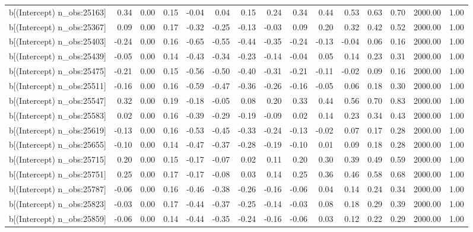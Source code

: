 \begin{table}[ht]
\begin{tabular}{rrrrrrrrrrrrrrr}
  b[(Intercept) n\_obs:25163] & 0.34 & 0.00 & 0.15 & -0.04 & 0.04 & 0.15 & 0.24 & 0.34 & 0.44 & 0.53 & 0.63 & 0.70 & 2000.00 & 1.00 \\ 
  b[(Intercept) n\_obs:25367] & 0.09 & 0.00 & 0.17 & -0.32 & -0.25 & -0.13 & -0.03 & 0.09 & 0.20 & 0.32 & 0.42 & 0.52 & 2000.00 & 1.00 \\ 
  b[(Intercept) n\_obs:25403] & -0.24 & 0.00 & 0.16 & -0.65 & -0.55 & -0.44 & -0.35 & -0.24 & -0.13 & -0.04 & 0.06 & 0.16 & 2000.00 & 1.00 \\ 
  b[(Intercept) n\_obs:25439] & -0.05 & 0.00 & 0.14 & -0.43 & -0.34 & -0.23 & -0.14 & -0.04 & 0.05 & 0.14 & 0.23 & 0.31 & 2000.00 & 1.00 \\ 
  b[(Intercept) n\_obs:25475] & -0.21 & 0.00 & 0.15 & -0.56 & -0.50 & -0.40 & -0.31 & -0.21 & -0.11 & -0.02 & 0.09 & 0.16 & 2000.00 & 1.00 \\ 
  b[(Intercept) n\_obs:25511] & -0.16 & 0.00 & 0.16 & -0.59 & -0.47 & -0.36 & -0.26 & -0.16 & -0.05 & 0.06 & 0.18 & 0.30 & 2000.00 & 1.00 \\ 
  b[(Intercept) n\_obs:25547] & 0.32 & 0.00 & 0.19 & -0.18 & -0.05 & 0.08 & 0.20 & 0.33 & 0.44 & 0.56 & 0.70 & 0.83 & 2000.00 & 1.00 \\ 
  b[(Intercept) n\_obs:25583] & 0.02 & 0.00 & 0.16 & -0.39 & -0.29 & -0.19 & -0.09 & 0.02 & 0.14 & 0.23 & 0.34 & 0.43 & 2000.00 & 1.00 \\ 
  b[(Intercept) n\_obs:25619] & -0.13 & 0.00 & 0.16 & -0.53 & -0.45 & -0.33 & -0.24 & -0.13 & -0.02 & 0.07 & 0.17 & 0.28 & 2000.00 & 1.00 \\ 
  b[(Intercept) n\_obs:25655] & -0.10 & 0.00 & 0.14 & -0.47 & -0.37 & -0.28 & -0.19 & -0.10 & 0.01 & 0.09 & 0.18 & 0.28 & 2000.00 & 1.00 \\ 
  b[(Intercept) n\_obs:25715] & 0.20 & 0.00 & 0.15 & -0.17 & -0.07 & 0.02 & 0.11 & 0.20 & 0.30 & 0.39 & 0.49 & 0.59 & 2000.00 & 1.00 \\ 
  b[(Intercept) n\_obs:25751] & 0.25 & 0.00 & 0.17 & -0.17 & -0.08 & 0.03 & 0.14 & 0.25 & 0.36 & 0.46 & 0.58 & 0.68 & 2000.00 & 1.00 \\ 
  b[(Intercept) n\_obs:25787] & -0.06 & 0.00 & 0.16 & -0.46 & -0.38 & -0.26 & -0.16 & -0.06 & 0.04 & 0.14 & 0.24 & 0.34 & 2000.00 & 1.00 \\ 
  b[(Intercept) n\_obs:25823] & -0.03 & 0.00 & 0.17 & -0.44 & -0.37 & -0.25 & -0.14 & -0.03 & 0.08 & 0.18 & 0.29 & 0.39 & 2000.00 & 1.00 \\ 
  b[(Intercept) n\_obs:25859] & -0.06 & 0.00 & 0.14 & -0.44 & -0.35 & -0.24 & -0.16 & -0.06 & 0.03 & 0.12 & 0.22 & 0.29 & 2000.00 & 1.00 \\ 

\end{tabular}
\end{table}
